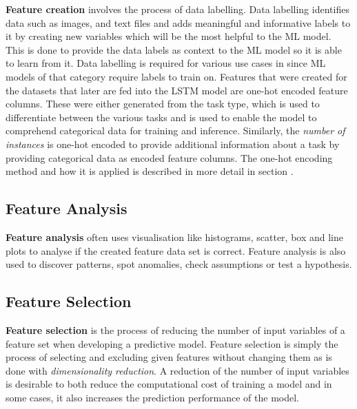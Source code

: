     \textbf{Feature creation} involves the process of data labelling.
    Data labelling identifies data such as images, and text files and adds meaningful and informative labels to it by creating new variables which will be the most helpful to the ML model. This is done to provide the data labels as context to the ML model so it is able to learn from it. Data labelling is required for various use cases in  since ML models of that category require labels to train on. Features that were created for the datasets that later are fed into the LSTM model are one-hot encoded feature columns. These were either generated from the task type, which is used to differentiate between the various tasks and is used to enable the model to comprehend categorical data for training and inference. Similarly, the \emph{number of instances} is one-hot encoded to provide additional information about a task by providing categorical data as encoded feature columns. The one-hot encoding method and how it is applied is described in more detail in section .

    \subsection{Feature Analysis}
    \label{sec:feature-analysis-preprocessing-architecture}
    
      \textbf{Feature analysis} often uses visualisation like histograms, scatter, box and line plots to analyse if the created feature data set is correct. Feature analysis is also used to discover patterns, spot anomalies, check assumptions or test a hypothesis.

    \subsection{Feature Selection}
    \label{sec:feature-selection-data-preprocessing-architecture}
  
      \textbf{Feature selection} is the process of reducing the number of input variables of a feature set when developing a predictive model.
      Feature selection is simply the process of selecting and excluding given features without changing them as is done with \emph{dimensionality reduction}.
      A reduction of the number of input variables is desirable to both reduce the computational cost of training a model and in some cases, it also increases the prediction performance of the model.
  

